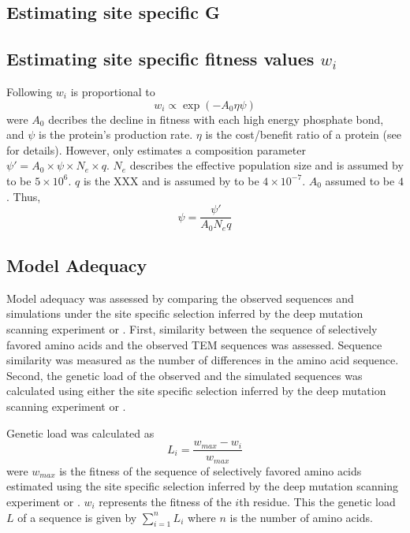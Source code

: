 \documentclass[12pt]{article}
\begin{document}
\subsection*{Estimating site specific G}


\subsection*{Estimating site specific fitness values $w_i$}

Following \citet{beaulieu2018} $w_i$ is proportional to
\begin{equation}
w_i \propto \exp(-A_0\eta\psi)
\end{equation}
were $A_0$ decribes the decline in fitness with each high energy phosphate bond, and $\psi$ is the protein's production rate.
$\eta$ is the cost/benefit ratio of a protein (see \citep{beaulieu2018} for details). 
However, \selac only estimates a composition parameter $\psi' = A_0\times\psi\times N_e\times q$.
$N_e$ describes the effective population size and is assumed by \selac to be $5\times 10^6$.
$q$ is the XXX and is assumed by \selac to be $4\times 10^{-7}$.
$A_0$ assumed to be $4$.
Thus, 
\begin{equation}
\psi = \frac{\psi'}{A_0N_eq}
\end{equation}


\subsection*{Model Adequacy}

Model adequacy was assessed by comparing the observed sequences and simulations under the site specific selection inferred by the deep mutation scanning experiment or \selac.
First, similarity between the sequence of selectively favored amino acids and the observed TEM sequences was assessed.
Sequence similarity was measured as the number of differences in the amino acid sequence.
Second, the genetic load of the observed and the simulated sequences was calculated using either the site specific selection inferred by the deep mutation scanning experiment or \selac.

Genetic load was calculated as
\begin{equation}
L_i = \frac{w_{max} - w_i}{w_{max}}
\end{equation}
were $w_{max}$ is the fitness of the sequence of selectively favored amino acids estimated using  the site specific selection inferred by the deep mutation scanning experiment or \selac.
$w_i$ represents the fitness of the $i$th residue.
This the genetic load $L$ of a sequence is given by $\sum_{i=1}^n L_i$ where $n$ is the number of amino acids.
\end{document}
